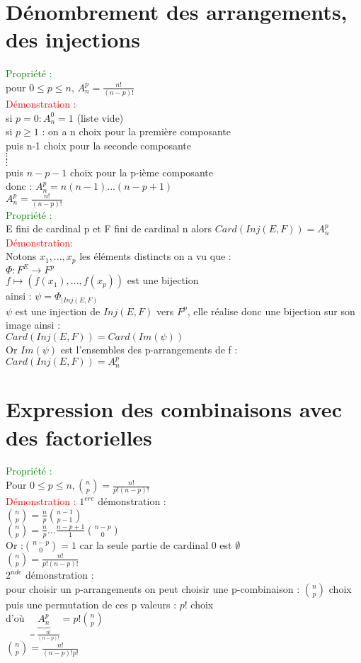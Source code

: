 \documentclass{article}
\begin{document}
\section{Dénombrement des arrangements, des injections}
\textcolor{green}{Propriété : } \\
pour $0 \leq p \leq n $, $A_n^p=\frac{n!}{(n-p)!}$ \\
\textcolor{red}{Démonstration :} \\
si $p=0: A_n^0=1$ (liste vide) \\
si $p \geq 1$ : on a n choix pour la première composante \\
puis n-1 choix pour la seconde composante \\
$\vdots$ \\
$\vdots$ \\
puis $n-p-1$ choix pour la p-ième composante \\
donc : $A_n^p=n(n-1)...(n-p+1)$ \\
$A_n^p=\frac{n!}{(n-p)!}$ \\
\textcolor{green}{Propriété :} \\
E fini de cardinal p et F fini de cardinal n alors $Card(Inj(E,F))=A_n^p$ \\
\textcolor{red}{Démonstration: } \\
Notons $x_1,...,x_p$ les éléments distincts on a vu que : \\
$\Phi : F^E \rightarrow F^p$ \\
$f \mapsto (f(x_1),...,f(x_p))$ est une bijection \\
ainsi : $\psi=\Phi_{|Inj(E,F)} $ \\
$\psi$ est une injection de $Inj(E,F)$ vers $F^p$, elle réalise donc une bijection sur son image ainsi : \\
$Card(Inj(E,F))=Card(Im(\psi))$ \\
Or $Im(\psi)$ est l'ensembles des p-arrangements de f : \\
$Card(Inj(E,F))=A_n^p$
\section{Expression des combinaisons avec des factorielles}
\textcolor{green}{Propriété :} \\
Pour $0 \leq p \leq n , \binom{n}{p}=\frac {n!} {p!(n-p)!}$ \\
\textcolor{red}{Démonstration :} $1^{ere}$ démonstration : \\
$\binom{n}{p}=\frac n p \binom{n-1}{p-1}$ \\
$\binom{n}{p}= \frac n p ... \frac {n-p+1} 1 \binom {n-p} 0$ \\
Or :$\binom {n-p} 0 =1$ car la seule partie de cardinal 0 est $\emptyset$ \\
$\binom n p = \frac {n!} {p!(n-p)!}$ \\
$2^{nde}$ démonstration : \\
pour choisir un p-arrangements on peut choisir une p-combinaison : $\binom n p$ choix puis une permutation de ces p valeurs : $p!$ choix \\
d'où $\underbrace{A_n^p}_{=\frac {n!} {(n-p)!}}=p! \binom n p $ \\
$\binom n p= \frac {n!} {(n-p)! p!}$
\end{document}
